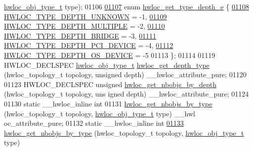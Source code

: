 \begin{DoxyCode}
      \hyperlink{a00041_gacd37bb612667dc437d66bfb175a8dc55}{hwloc_obj_type_t} type);
01106 
\hypertarget{a00033_source_l01107}{}\hyperlink{a00046_gaf4e663cf42bbe20756b849c6293ef575}{01107} \textcolor{keyword}{enum} \hyperlink{a00046_gaf4e663cf42bbe20756b849c6293ef575}{hwloc_get_type_depth_e} \{
\hypertarget{a00033_source_l01108}{}\hyperlink{a00046_ggaf4e663cf42bbe20756b849c6293ef575a0565ab92ab72cb0cec91e23003294aad}{01108}     \hyperlink{a00046_ggaf4e663cf42bbe20756b849c6293ef575a0565ab92ab72cb0cec91e23003294aad}{HWLOC_TYPE_DEPTH_UNKNOWN} = -1,    
\hypertarget{a00033_source_l01109}{}\hyperlink{a00046_ggaf4e663cf42bbe20756b849c6293ef575ae99465995cacde6c210d5fc2e409798c}{01109}     \hyperlink{a00046_ggaf4e663cf42bbe20756b849c6293ef575ae99465995cacde6c210d5fc2e409798c}{HWLOC_TYPE_DEPTH_MULTIPLE} = -2,   
\hypertarget{a00033_source_l01110}{}\hyperlink{a00046_ggaf4e663cf42bbe20756b849c6293ef575af93b50182973e4a718d9d4db9e253a90}{01110}     \hyperlink{a00046_ggaf4e663cf42bbe20756b849c6293ef575af93b50182973e4a718d9d4db9e253a90}{HWLOC_TYPE_DEPTH_BRIDGE} = -3,     
\hypertarget{a00033_source_l01111}{}\hyperlink{a00046_ggaf4e663cf42bbe20756b849c6293ef575ad8b1516e699b57ce1c8d107fbd2f674c}{01111}     \hyperlink{a00046_ggaf4e663cf42bbe20756b849c6293ef575ad8b1516e699b57ce1c8d107fbd2f674c}{HWLOC_TYPE_DEPTH_PCI_DEVICE} = -4, 
\hypertarget{a00033_source_l01112}{}\hyperlink{a00046_ggaf4e663cf42bbe20756b849c6293ef575afe9a2131073eebbe129d4aa2928d3f46}{01112}     \hyperlink{a00046_ggaf4e663cf42bbe20756b849c6293ef575afe9a2131073eebbe129d4aa2928d3f46}{HWLOC_TYPE_DEPTH_OS_DEVICE} = -5   
01113 \};
01114 
01119 HWLOC\_DECLSPEC \hyperlink{a00041_gacd37bb612667dc437d66bfb175a8dc55}{hwloc_obj_type_t} \hyperlink{a00046_gadd4964764ae7e49231065d58a553fd31}{hwloc_get_depth_type} (hwloc\_topology\_t topology, 
      \textcolor{keywordtype}{unsigned} depth) \_\_hwloc\_attribute\_pure;
01120 
01123 HWLOC\_DECLSPEC \textcolor{keywordtype}{unsigned} \hyperlink{a00046_ga20cfe2456f4cfdd789c9aca6d2fdd69f}{hwloc_get_nbobjs_by_depth} (hwloc\_topology\_t topology, \textcolor{keywordtype}{uns
      igned} depth) \_\_hwloc\_attribute\_pure;
01124 
01130 \textcolor{keyword}{static} \_\_hwloc\_inline \textcolor{keywordtype}{int}
01131 \hyperlink{a00046_gaba821f84ef64282d14577066e6d6547e}{hwloc_get_nbobjs_by_type} (hwloc\_topology\_t topology, \hyperlink{a00041_gacd37bb612667dc437d66bfb175a8dc55}{hwloc_obj_type_t} type) \_\_hwl
      oc\_attribute\_pure;
01132 \textcolor{keyword}{static} \_\_hwloc\_inline \textcolor{keywordtype}{int}
\hypertarget{a00033_source_l01133}{}\hyperlink{a00046_gaba821f84ef64282d14577066e6d6547e}{01133} \hyperlink{a00046_gaba821f84ef64282d14577066e6d6547e}{hwloc_get_nbobjs_by_type} (hwloc\_topology\_t topology, \hyperlink{a00041_gacd37bb612667dc437d66bfb175a8dc55}{hwloc_obj_type_t} type)

\end{DoxyCode}
